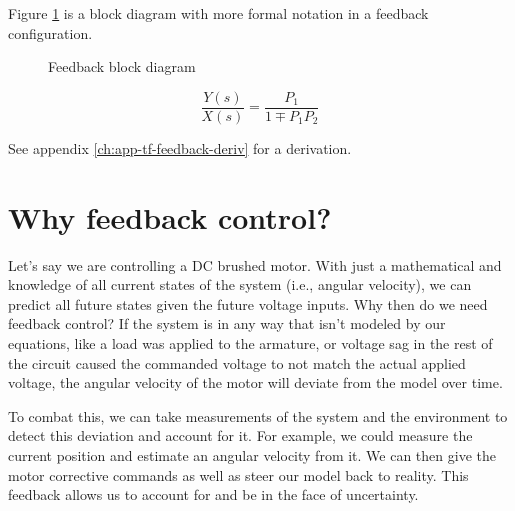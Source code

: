 Figure \ref{fig:feedback_block_diagram} is a block diagram with more formal
notation in a feedback configuration.

\begin{figure}[H]
  \centering


  \caption{Feedback block diagram}
  \label{fig:feedback_block_diagram}
\end{figure}

\begin{theorem}
  \begin{equation}
    \frac{Y(s)}{X(s)} = \frac{P_1}{1 \mp P_1 P_2}
  \end{equation}
\end{theorem}

See appendix \ref{ch:app-tf-feedback-deriv} for a derivation.

\section{Why feedback control?}

Let's say we are controlling a DC brushed motor. With just a mathematical
 and knowledge of all current \glspl{state}
of the \gls{system} (i.e., angular velocity), we can predict all future
\glspl{state} given the future voltage \glspl{input}. Why then do we need
feedback control? If the system is  in any way
that isn't modeled by our equations, like a load was applied to the armature, or
voltage sag in the rest of the circuit caused the commanded voltage to not match
the actual applied voltage, the angular velocity of the motor will deviate from
the \gls{model} over time.

To combat this, we can take measurements of the system and the environment to
detect this deviation and account for it. For example, we could measure the
current position and estimate an angular velocity from it. We can then give the
motor corrective commands as well as steer our \gls{model} back to reality. This
feedback allows us to account for and be  in the
face of uncertainty.
